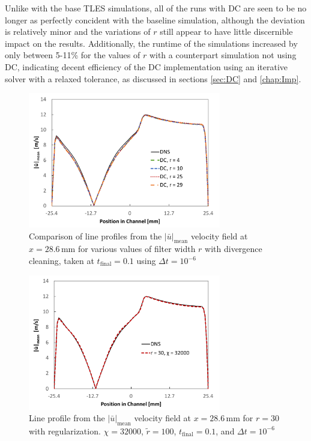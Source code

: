 Unlike with the base TLES simulations, all of the runs with DC are seen to be no longer as perfectly concident with the baseline simulation, although the deviation is relatively minor and the variations of $r$ still appear to have little discernible impact on the results. Additionally, the runtime of the simulations increased by only between 5-11\% for the values of $r$ with a counterpart simulation not using DC, indicating decent efficiency of the DC implementation using an iterative solver with a relaxed tolerance, as discussed in sections \ref{sec:DC} and \ref{chap:Imp}.

\begin{figure}[!t]
\centering
\includegraphics[width=0.75\textwidth]{figures/line_data_DC.pdf}
\caption{Comparison of line profiles from the $|\bar{u}|_{\mathrm{mean}}$ velocity field at $x=28.6\,\mathrm{mm}$ for various values of filter width $r$ with divergence cleaning, taken at $t_\mathrm{final}=0.1$ using $\Delta t=10^{-6}$}
\label{fig:line_data_DC}
\end{figure}

\begin{figure}[!h]
\centering
\includegraphics[width=0.75\textwidth]{figures/line_data_reg.pdf}
\caption{Line profile from the $|\bar{u}|_{\mathrm{mean}}$ velocity field at $x=28.6\,\mathrm{mm}$ for $r=30$ with regularization. $\chi = 32000$, $\tilde{r}=100$, $t_\mathrm{final}=0.1$, and $\Delta t=10^{-6}$}
\label{fig:line_data_reg}
\end{figure}

